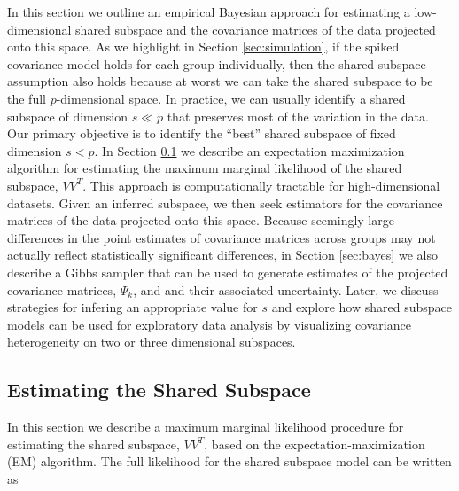 \documentclass[12pt]{article}
\begin{document}
In this section we outline an empirical Bayesian approach for
estimating a low-dimensional shared subspace and the covariance
matrices of the data projected onto this space. As we highlight in
Section \ref{sec:simulation}, if the spiked covariance model holds for
each group individually, then the shared subspace assumption also
holds because at worst we can take the shared subspace to be the full
$p$-dimensional space. In practice, we can usually identify a shared
subspace of dimension $s \ll p$ that preserves most of the variation
in the data.  Our primary objective is to identify the ``best'' shared
subspace of fixed dimension $s < p$.  In Section \ref{sec:em} we
describe an expectation maximization algorithm for estimating the
maximum marginal likelihood of the shared subspace, $VV^T$.  This
approach is computationally tractable for high-dimensional datasets.
Given an inferred subspace, we then seek estimators for the covariance
matrices of the data projected onto this space.  Because seemingly
large differences in the point estimates of covariance matrices across
groups may not actually reflect statistically significant differences,
in Section \ref{sec:bayes} we also describe a Gibbs sampler that can
be used to generate estimates of the projected covariance matrices,
$\Psi_k$, and and their associated uncertainty.  Later, we discuss
strategies for infering an appropriate value for $s$ and explore how
shared subspace models can be used for exploratory data analysis by
visualizing covariance heterogeneity on two or three dimensional
subspaces.





\subsection{Estimating the  Shared Subspace}
\label{sec:em}

In this section we describe a maximum marginal likelihood procedure for
estimating the shared subspace, $VV^T$, based on the
expectation-maximization (EM) algorithm.  The full likelihood
for the shared subspace model can be written as
\end{document}
